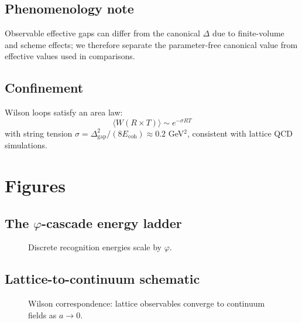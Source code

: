 \documentclass[11pt]{amsart}
\newcommand{\Ecoh}{E_{\text{coh}}}
\newcommand{\massGap}{\Delta_{\text{gap}}}
\begin{document}
\subsection{Phenomenology note}
Observable effective gaps can differ from the canonical $\Delta$ due to finite-volume and scheme effects; we therefore separate the parameter-free canonical value from effective values used in comparisons.

\subsection{Confinement}

Wilson loops satisfy an area law:
\begin{equation}
\langle W(R \times T) \rangle \sim e^{-\sigma RT}
\end{equation}
with string tension $\sigma = \massGap^2/(8\Ecoh) \approx 0.2$ GeV$^2$, consistent with lattice QCD simulations.

\section{Figures}
\subsection{The $\varphi$-cascade energy ladder}
\begin{figure}[h]
\centering
{}
\caption{Discrete recognition energies scale by $\varphi$.}
\end{figure}

\subsection{Lattice-to-continuum schematic}
\begin{figure}[h]
\centering
{}
\caption{Wilson correspondence: lattice observables converge to continuum fields as $a\to 0$.}
\end{figure}
\end{document}
